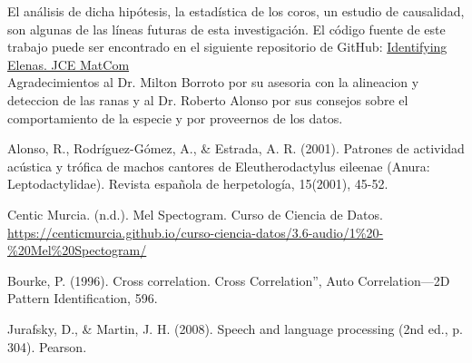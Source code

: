 \documentclass[a4paper,10pt,twocolumn]{article}
\begin{document}
El análisis de dicha hipótesis, la estadística de los coros,
un estudio de causalidad, son algunas de las líneas futuras de esta investigación. 
El código fuente de este trabajo puede ser encontrado en el siguiente repositorio de GitHub:
\href{https://github.com/DanielMPMatCom/Identifying-Elenas.-JCE-MatCom.git}{Identifying Elenas. JCE MatCom}\\


Agradecimientos al Dr. Milton Borroto por su asesoria con la alineacion y deteccion de las ranas y al Dr. Roberto Alonso por sus consejos sobre el comportamiento de la especie y por proveernos de los datos.

\begin{thebibliography}{}
	
	 Alonso, R., Rodríguez-Gómez, A., \& Estrada, A. R. (2001). Patrones de actividad acústica y trófica de machos cantores de Eleutherodactylus eileenae (Anura: Leptodactylidae). Revista española de herpetología, 15(2001), 45-52.

	
	 Centic Murcia. (n.d.). Mel Spectogram. Curso de Ciencia de Datos. \href{https://centicmurcia.github.io/curso-ciencia-datos/3.6-audio/1\%20-\%20Mel\%20Spectogram/}{https://centicmurcia.github.io/curso-ciencia-datos/3.6-audio/1\%20-\%20Mel\%20Spectogram/}
	
	\sloppypar
	 Bourke, P. (1996). Cross correlation. Cross Correlation”, Auto Correlation—2D Pattern Identification, 596.
  
	 Jurafsky, D., \& Martin, J. H. (2008). Speech and language processing (2nd ed., p. 304). Pearson.

\end{thebibliography}
	  




\label{end}
\end{document}
